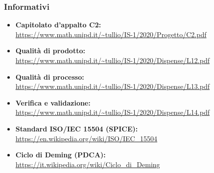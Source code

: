 \subsubsection{Informativi} \label{riferimenti_info}
\begin{itemize}
	\item \textbf{Capitolato d'appalto C2:}\\
	\url{https://www.math.unipd.it/~tullio/IS-1/2020/Progetto/C2.pdf}
	\item \textbf{Qualità di prodotto:}\\ \url{https://www.math.unipd.it/~tullio/IS-1/2020/Dispense/L12.pdf}
	\item \textbf{Qualità di processo:}\\ \url{https://www.math.unipd.it/~tullio/IS-1/2020/Dispense/L13.pdf}
	\item \textbf{Verifica e validazione:}\\ \url{https://www.math.unipd.it/~tullio/IS-1/2020/Dispense/L14.pdf}
	\item \textbf{Standard ISO/IEC 15504 (SPICE):}\\ \url{https://en.wikipedia.org/wiki/ISO/IEC_15504}
	\item \textbf{Ciclo di Deming (PDCA):} \\ \url{https://it.wikipedia.org/wiki/Ciclo_di_Deming}
\end{itemize}